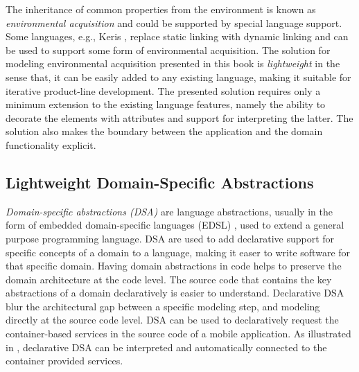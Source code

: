 The inheritance of common properties from the environment is known as \textit{environmental acquisition} \cite{lorenz.96,ea.05} and could be supported by special language support. Some languages, e.g., Keris \cite{keris.04}, replace static linking with dynamic linking and can be used to support some form of environmental acquisition. The solution for modeling environmental acquisition presented in this book is \textit{lightweight} in the sense that, it can be  easily added to any existing language, making it suitable for iterative product-line development. The presented solution requires only a minimum extension to the existing language features, namely the ability to decorate the elements with attributes and support for interpreting the latter. The solution also makes the boundary between the application and the domain functionality explicit.

\subsection{Lightweight Domain-Specific Abstractions}

\textit{Domain-specific abstractions (DSA)} are language abstractions, usually in the form of embedded domain-specific languages (EDSL) \cite{kamin.98}, used to extend a general purpose programming language. DSA are used to add declarative support for specific concepts of a domain to a language, making it easer to write software for that specific domain. Having domain abstractions in code helps to preserve the domain architecture at the code level. The source code that contains the key abstractions of a domain declaratively is easier to understand. Declarative DSA blur the architectural gap \cite{sf.04} between a specific modeling step, and modeling directly at the source code level. DSA can be used to declaratively request the container-based services in the source code of a mobile application. As illustrated in , declarative DSA can be interpreted and automatically connected to the container provided services.



